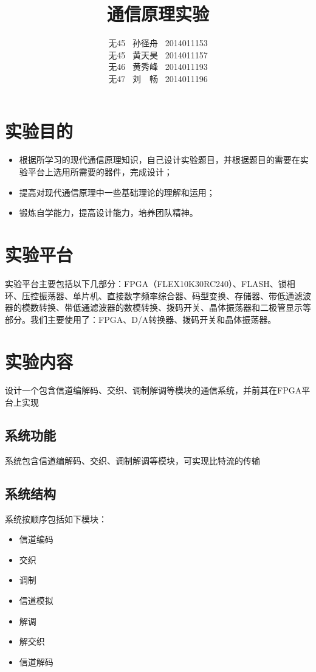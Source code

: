 \documentclass[UTF8]{ctexart}
\date{}
\title{\textbf{通信原理实验}}
\author{无45 \ 孙径舟 \ 2014011153\\
        无45 \ 黄天昊 \ 2014011157\\
        无46 \ 黄秀峰 \ 2014011193\\
        无47 \ 刘　畅 \ 2014011196}
\begin{document}
\maketitle

\section{实验目的}

\begin{itemize}

\item 根据所学习的现代通信原理知识，自己设计实验题目，并根据题目的需要在实验平台上选用所需要的器件，完成设计；
\item 提高对现代通信原理中一些基础理论的理解和运用；
\item 锻炼自学能力，提高设计能力，培养团队精神。

\end{itemize}

\section{实验平台}

实验平台主要包括以下几部分：FPGA（FLEX10K30RC240）、FLASH、锁相环、压控振荡器、单片机、直接数字频率综合器、码型变换、存储器、带低通滤波器的模数转换、带低通滤波器的数模转换、拨码开关、晶体振荡器和二极管显示等部分。我们主要使用了：FPGA、D/A转换器、拨码开关和晶体振荡器。

\section{实验内容}

设计一个包含信道编解码、交织、调制解调等模块的通信系统，并前其在FPGA平台上实现

\subsection{系统功能}

系统包含信道编解码、交织、调制解调等模块，可实现比特流的传输

\subsection{系统结构}

系统按顺序包括如下模块：

\begin{itemize}

\item 信道编码
\item 交织
\item 调制
\item 信道模拟
\item 解调
\item 解交织
\item 信道解码

\end{itemize}
\end{document}

